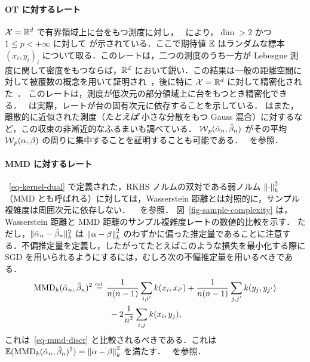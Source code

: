\paragraph{OT に対するレート}

$\mathcal{X}=\mathbb{R}^d$ で有界領域上に台をもつ測度に対し，~\citep{dudley1969speed} により，$\dim>2$ かつ $1 \leq p < +\infty$ に対して
が示されている．ここで期待値 $\mathbb{E}$ はランダムな標本 $(x_i,y_i)_i$ について取る．このレートは，二つの測度のうち一方が Lebesgue 測度に関して密度をもつならば，$\mathbb{R}^d$ において鋭い．この結果は一般の距離空間に対して被覆数の概念を用いて証明され~\citep{dudley1969speed}，後に特に $\mathcal{X}=\mathbb{R}^d$ に対して精密化された~\citep{dereich2013constructive,fournier2015rate}．
このレートは，測度が低次元の部分領域上に台をもつとき精密化できる．~\citet{weed2017sharp} は実際，レートが台の固有次元に依存することを示している．\citeauthor{weed2017sharp} はまた，離散的に近似された測度（\emph{たとえば} 小さな分散をもつ Gauss 混合）に対するなど，この収束の非漸近的なふるまいも調べている．
%
$\operatorname{\mathcal{W}}_p(\hat {\alpha}_n,\hat {\beta}_n)$ がその平均 $\operatorname{\mathcal{W}}_p(\alpha,\beta)$ の周りに集中することを証明することも可能である．~\citep{bolley2007quantitative,boissard2011simple,weed2017sharp} を参照．

\paragraph{MMD に対するレート}

~\eqref{eq-kernel-dual} で定義された，RKHS ノルムの双対である弱ノルム $\left\| \cdot \right\|^2_{k}$（MMD とも呼ばれる）に対しては，Wasserstein 距離とは対照的に，サンプル複雑度は周囲次元に依存しない．
~\citep{sriperumbudur2012empirical} を参照．
%
図~\ref{fig-sample-complexity} は，Wasserstein 距離と MMD 距離のサンプル複雑度レートの数値的比較を示す．
%
ただし，$\| \hat {\alpha}_n-\hat {\beta}_n \|_{k}^2$ は $\left\| \alpha-\beta \right\|_{k}^2$ のわずかに偏った推定量であることに注意する．不偏推定量を定義し，したがってたとえばこのような損失を最小化する際に SGD を用いられるようにするには，むしろ次の不偏推定量を用いるべきである．
\begin{align*}
	\text{MMD}_{k}(\hat {\alpha}_n,\hat {\beta}_n)^2 & \stackrel{\mbox{\upshape\tiny def.}}{=}
		\frac{1}{n(n-1)} \sum_{i,i'} k(x_i,x_{i'})	+
		\frac{1}{n(n-1)}\sum_{j,j'} k(y_j,y_{j'}) \\
		 & \qquad - 2
		\frac{1}{n^2}\sum_{i,j} k(x_i,y_j),
\end{align*}
これは~\eqref{eq-mmd-discr} と比較されるべきである．これは $\mathbb{E}(\text{MMD}_{k}(\hat {\alpha}_n,\hat {\beta}_n)^2) = \left\| \alpha-\beta \right\|_{k}^2$ を満たす．~\citep{gretton2012kernel} を参照．


